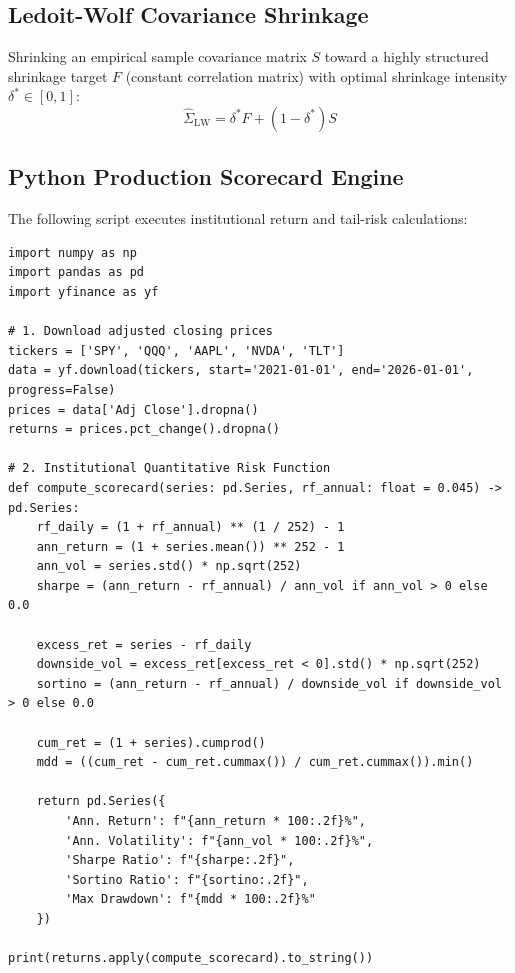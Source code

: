 \documentclass[11pt,a4paper]{article}
\begin{document}
\subsection{Ledoit-Wolf Covariance Shrinkage}
Shrinking an empirical sample covariance matrix $S$ toward a highly structured shrinkage target $F$ (constant correlation matrix) with optimal shrinkage intensity $\delta^* \in [0, 1]$:
\begin{equation}
\hat{\Sigma}_{\text{LW}} = \delta^* F + (1 - \delta^*) S
\end{equation}

\subsection{Python Production Scorecard Engine}
The following script executes institutional return and tail-risk calculations:

\begin{lstlisting}
import numpy as np
import pandas as pd
import yfinance as yf

# 1. Download adjusted closing prices
tickers = ['SPY', 'QQQ', 'AAPL', 'NVDA', 'TLT']
data = yf.download(tickers, start='2021-01-01', end='2026-01-01', progress=False)
prices = data['Adj Close'].dropna()
returns = prices.pct_change().dropna()

# 2. Institutional Quantitative Risk Function
def compute_scorecard(series: pd.Series, rf_annual: float = 0.045) -> pd.Series:
    rf_daily = (1 + rf_annual) ** (1 / 252) - 1
    ann_return = (1 + series.mean()) ** 252 - 1
    ann_vol = series.std() * np.sqrt(252)
    sharpe = (ann_return - rf_annual) / ann_vol if ann_vol > 0 else 0.0
    
    excess_ret = series - rf_daily
    downside_vol = excess_ret[excess_ret < 0].std() * np.sqrt(252)
    sortino = (ann_return - rf_annual) / downside_vol if downside_vol > 0 else 0.0
    
    cum_ret = (1 + series).cumprod()
    mdd = ((cum_ret - cum_ret.cummax()) / cum_ret.cummax()).min()
    
    return pd.Series({
        'Ann. Return': f"{ann_return * 100:.2f}%",
        'Ann. Volatility': f"{ann_vol * 100:.2f}%",
        'Sharpe Ratio': f"{sharpe:.2f}",
        'Sortino Ratio': f"{sortino:.2f}",
        'Max Drawdown': f"{mdd * 100:.2f}%"
    })

print(returns.apply(compute_scorecard).to_string())
\end{lstlisting}

\vspace{10pt}
\end{document}
